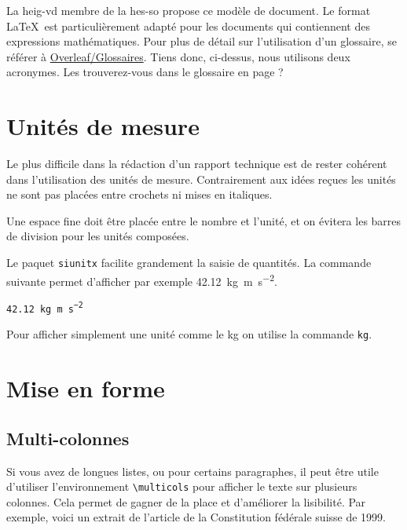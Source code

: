 La \Gls{heig-vd} membre de la \Gls{hes-so} propose ce modèle de document. Le format \LaTeX~est particulièrement adapté pour les documents qui contiennent des expressions mathématiques. Pour plus de détail sur l'utilisation d'un glossaire, se référer à \href{https://www.overleaf.com/learn/latex/Glossaries}{Overleaf/Glossaires}. Tiens donc, ci-dessus, nous utilisons deux acronymes. Les trouverez-vous dans le glossaire en page \pageref{glossaire} ?

\section{Unités de mesure}

Le plus difficile dans la rédaction d'un rapport technique est de rester cohérent dans l'utilisation des unités de mesure. Contrairement aux idées reçues les unités ne sont pas placées entre crochets ni mises en italiques.

Une espace fine doit être placée entre le nombre et l'unité, et on évitera les barres de division pour les unités composées.

Le paquet \texttt{siunitx} facilite grandement la saisie de quantités. La commande suivante permet d'afficher par exemple \qty{42.12}{\kilo\gram\metre\per\square\second}.\par

\texttt{\qty{42.12}{\kilo\gram\metre\per\square\second}}\par

Pour afficher simplement une unité comme le \si{\kilo\gram} on utilise la commande \texttt{\si{\kilo\gram}}.

\section{Mise en forme}

\subsection{Multi-colonnes}

Si vous avez de longues listes, ou pour certains paragraphes, il peut être utile d'utiliser l'environnement \verb|\multicols| pour afficher le texte sur plusieurs colonnes. Cela permet de gagner de la place et d'améliorer la lisibilité. Par exemple, voici un extrait de l'article de la Constitution fédérale suisse de 1999.

